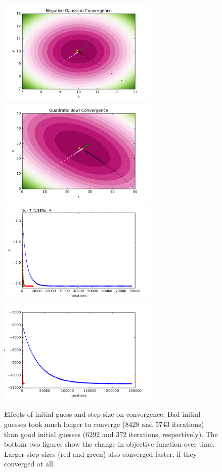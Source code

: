 \documentclass{article}
\begin{document}
\begin{multicols}{2}
\begin{figure}
   \centering
   \includegraphics[width=3in]{img/1-1-gauss.pdf}
   \includegraphics[width=3in]{img/1-1-quad.pdf}
   \includegraphics[width=3in]{img/1-1-etaGauss.pdf}
   \includegraphics[width=3in]{img/1-1-etaQuad.pdf}
   \caption{Effects of initial guess and step size on convergence. Bad initial guesses took much longer to converge (8428 and 5743 iterations) than good initial guesses (6292 and 372 iterations, respectively). The bottom two figures show the change in objective function over time. Larger step sizes (red and green) also converged faster, if they converged at all.}
   \label{fig:1.1}
\end{figure}


\end{multicols}
\end{document}
